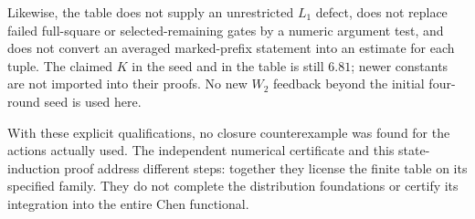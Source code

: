 \documentclass[11pt]{article}
\begin{document}
Likewise, the table does not supply an unrestricted $L_1$ defect,
does not replace failed full-square or selected-remaining gates by a
numeric argument test, and does not convert an averaged marked-prefix
statement into an estimate for each tuple. The claimed $K$ in the
seed and in the table is still $6.81$; newer constants are not imported
into their proofs. No new $W_2$ feedback beyond the initial four-round
seed is used here.

With these explicit qualifications, no closure counterexample was
found for the actions actually used. The independent numerical
certificate and this state-induction proof address different steps:
together they license the finite table on its specified family.
They do not complete the distribution foundations or certify its
integration into the entire Chen functional.
\end{document}
